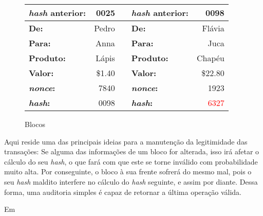 	\begin{figure}[H]
		\centering
		\begin{tabular}{|lr|c|lr|}
		\hline
		\textbf{\textit{hash} anterior:} & 0025 &\hspace*{1cm}& \textbf{\textit{hash} anterior:} & 0098\\
		\hline
		\textbf{De:} & Pedro & & \textbf{De:} & Flávia \\
		\hline
		\textbf{Para:} & Anna & & \textbf{Para:} & Juca \\
		\hline
		\textbf{Produto:} & Lápis & & \textbf{Produto:} & Chapéu \\
		\hline	
		\textbf{Valor:} & \$1.40 & & \textbf{Valor:} & \$22.80\\
		\hline
		\textbf{\textit{nonce}:} & 7840 & & \textbf{\textit{nonce}:} & 1923 \\
		\hline
		\textbf{\textit{hash}:} & 0098 & & \textbf{\textit{hash}:} & \textcolor{red}{6327} \\
		\hline
		\end{tabular}
		\label{fig:blockchain2}
		\caption{Blocos}
	\end{figure}	
	
	Aqui reside uma das principais ideias para a manutenção da legitimidade das transações: Se alguma das informações de um bloco for alterada, isso irá afetar o cálculo do seu \textit{hash}, o que fará com que este se torne inválido com probabilidade muito alta. Por conseguinte, o bloco à sua frente sofrerá do mesmo mal, pois o seu \textit{hash} maldito interfere no cálculo do \textit{hash} seguinte, e assim por diante. Dessa forma, uma auditoria simples é capaz de retornar a última operação válida.
	
	\quest Em
	
	
	
